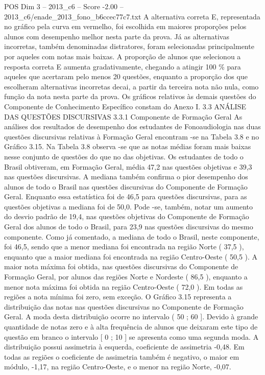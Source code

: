 \begin{textsample}{POS Dim 3 – 2013\_c6 – Score -2.00 – 2013\_c6/enade\_2013\_fono\_b6ccec77c7.txt}
A alternativa correta E, representada no gráfico pela curva em vermelho, foi escolhida em maiores proporções pelos alunos com desempenho melhor nesta parte da prova.
Já as alternativas incorretas, também denominadas distratores, foram selecionadas principalmente por aqueles com notas mais baixas.
A proporção de alunos que selecionou a resposta correta E aumenta gradativamente, chegando a atingir 100 \% para aqueles que acertaram pelo menos 20 questões, enquanto a proporção dos que escolheram alternativas incorretas decai, a partir da terceira nota não nula, como função da nota nesta parte da prova.
Os gráficos relativos às demais questões do Componente de Conhecimento Específico constam do Anexo I. 3.3 ANÁLISE DAS QUESTÕES DISCURSIVAS 3.3.1 Componente de Formação Geral As análises dos resultados de desempenho dos estudantes de Fonoaudiologia nas duas questões discursivas relativas à Formação Geral encontram -se na Tabela 3.8 e no Gráfico 3.15.
Na Tabela 3.8 observa -se que as notas médias foram mais baixas nesse conjunto de questões do que no das objetivas.
Os estudantes de todo o Brasil obtiveram, em Formação Geral, média 47,2 nas questões objetivas e 39,3 nas questões discursivas.
A mediana também confirma o pior desempenho dos alunos de todo o Brasil nas questões discursivas do Componente de Formação Geral.
Enquanto essa estatística foi de 46,5 para questões discursivas, para as questões objetivas a mediana foi de 50,0.
Pode -se, também, notar um aumento do desvio padrão de 19,4, nas questões objetivas do Componente de Formação Geral dos alunos de todo o Brasil, para 23,9 nas questões discursivas do mesmo componente.
Como já comentado, a mediana de todo o Brasil, neste componente, foi 46,5, sendo que a menor mediana foi encontrada na região Norte ( 37,5 ), enquanto que a maior mediana foi encontrada na região Centro-Oeste ( 50,5 ).
A maior nota máxima foi obtida, nas questões discursivas do Componente de Formação Geral, por alunos das regiões Norte e Nordeste ( 86,5 ), enquanto a menor nota máxima foi obtida na região Centro-Oeste ( 72,0 ).
Em todas as regiões a nota mínima foi zero, sem exceção.
O Gráfico 3.15 representa a distribuição das notas nas questões discursivas no Componente de Formação Geral.
A moda desta distribuição ocorre no intervalo ( 50 ; 60 ].
Devido à grande quantidade de notas zero e à alta frequência de alunos que deixaram este tipo de questão em branco o intervalo [ 0 ; 10 ] se apresenta como uma segunda moda.
A distribuição possui assimetria à esquerda, coeficiente de assimetria -0,48.
Em todas as regiões o coeficiente de assimetria também é negativo, o maior em módulo, -1,17, na região Centro-Oeste, e o menor na região Norte, -0,07.

\end{textsample}

